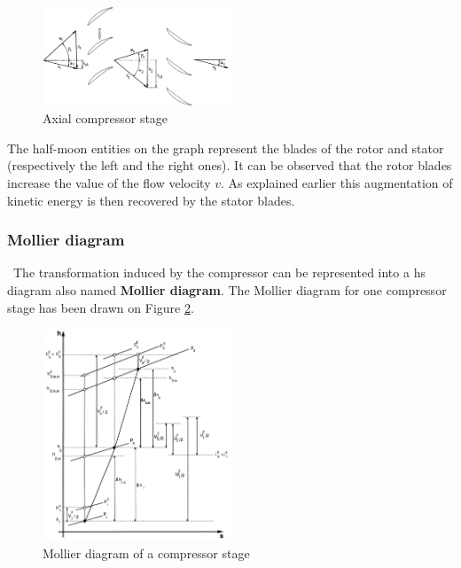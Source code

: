 \begin{figure}[h]
\centering
\includegraphics[width=0.5\textwidth]{Comp_stage.png}
\caption{Axial compressor stage \citep{Hillewaert2019}}
\label{fig:C3_compstage}
\end{figure}

The half-moon entities on the graph represent the blades of the rotor and stator (respectively the left and the right ones). It can be observed that the rotor blades increase the value of the flow velocity $v$. As explained earlier this augmentation of kinetic energy is then recovered by the stator blades. 

\subsubsection{Mollier diagram}
\quad\, The transformation induced by the compressor can be represented into a hs diagram also named \textbf{Mollier diagram}. The Mollier diagram for one compressor stage has been drawn on Figure \ref{fig:C3_Molliercomp}.

\begin{figure}[h]
\centering
\includegraphics[width=0.5\textwidth]{Comp_mollier.png}
\caption{Mollier diagram of a compressor stage \citep{Hillewaert2019}}
\label{fig:C3_Molliercomp}
\end{figure}

